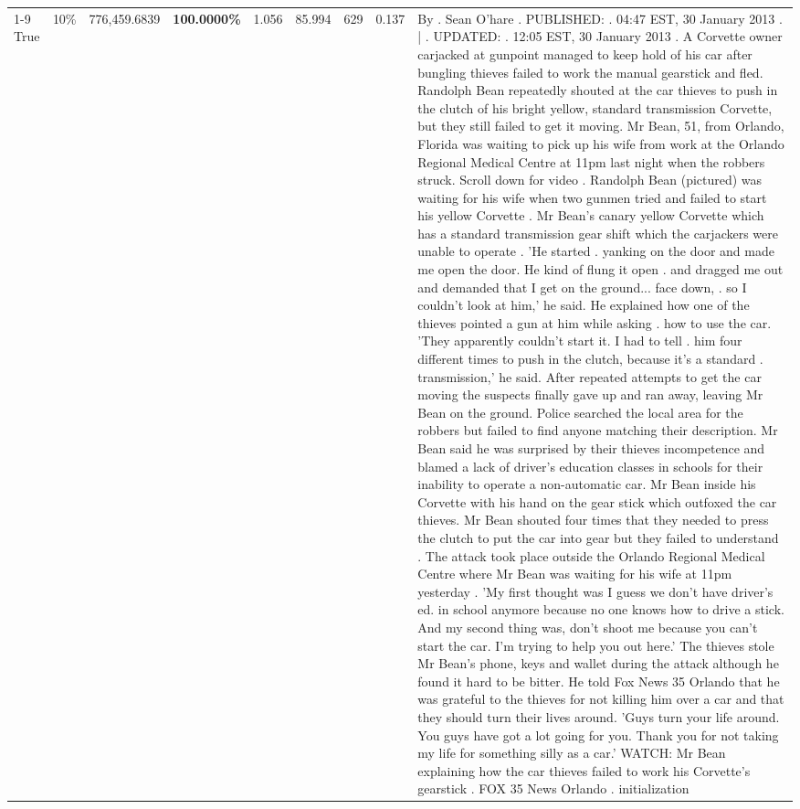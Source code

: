 \begin{table}[H]
\begin{tabular}{lllrlllll}
\cline{1-9} \cline{2-9}
True & 10\% & 776,459.6839 & \bfseries \color{red} 100.0000\% & 1.056 & 85.994 & 629 & 0.137 & By . Sean O'hare . PUBLISHED: . 04:47 EST, 30 January 2013 . | . UPDATED: . 12:05 EST, 30 January 2013 . A Corvette owner carjacked at gunpoint managed to keep hold of his car after bungling thieves failed to work the manual gearstick and fled. Randolph Bean repeatedly shouted at the car thieves to push in the clutch of his bright yellow, standard transmission Corvette, but they still failed to get it moving. Mr Bean, 51, from Orlando, Florida was waiting to pick up his wife from work at the Orlando Regional Medical Centre at 11pm last night when the robbers struck. Scroll down for video . Randolph Bean (pictured) was waiting for his wife when two gunmen tried and failed to start his yellow Corvette . Mr Bean's canary yellow Corvette which has a standard transmission gear shift which the carjackers were unable to operate . 'He started . yanking on the door and made me open the door. He kind of flung it open . and dragged me out and demanded that I get on the ground... face down, . so I couldn't look at him,' he said. He explained how one of the thieves pointed a gun at him while asking . how to use the car. 'They apparently couldn't start it. I had to tell . him four different times to push in the clutch, because it's a standard . transmission,' he said. After repeated attempts to get the car moving the suspects finally gave up and ran away, leaving Mr Bean on the ground. Police searched the local area for the robbers but failed to find anyone matching their description. Mr Bean said he was surprised by their thieves incompetence and blamed a lack of driver's education classes in schools for their inability to operate a non-automatic car. Mr Bean inside his Corvette with his hand on the gear stick which outfoxed the car thieves. Mr Bean shouted four times that they needed to press the clutch to put the car into gear but they failed to understand . The attack took place outside the Orlando Regional Medical Centre where Mr Bean was waiting for his wife at 11pm yesterday . 'My first thought was I guess we don't have driver's ed. in school anymore because no one knows how to drive a stick. And my second thing was, don't shoot me because you can't start the car. I'm trying to help you out here.' The thieves stole Mr Bean's phone, keys and wallet during the attack although he found it hard to be bitter. He told Fox News 35 Orlando that he was grateful to the thieves for not killing him over a car and that they should turn their lives around. 'Guys turn your life around. You guys have got a lot going for you. Thank you for not taking my life for something silly as a car.' WATCH: Mr Bean explaining how the car thieves failed to work his Corvette's gearstick . FOX 35 News Orlando . initialization \\

\end{tabular}
\end{table}
